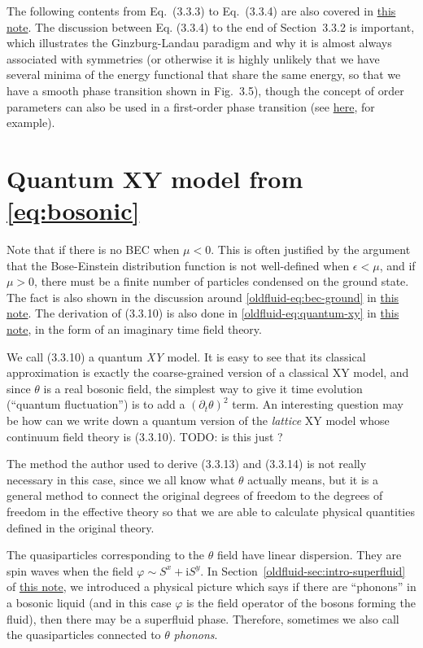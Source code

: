 \documentclass[hyperref, a4paper]{article}
\newcommand*{\ii}{\mathrm{i}}
\newcommand{\oldfluid}{\href{fluid.pdf}{this note}}
\begin{document}
The following contents from Eq.~(3.3.3) to Eq.~(3.3.4) are also covered in \oldfluid. 
The discussion between Eq. (3.3.4) to the end of Section~3.3.2 is important, which illustrates the 
Ginzburg-Landau paradigm and why it is almost always associated with symmetries (or otherwise it is 
highly unlikely that we have several minima of the energy functional that share the same energy, so 
that we have a smooth phase transition shown in Fig.~3.5), though the concept of order parameters 
can also be used in a first-order phase transition (see \href{../quasicrystal-fd/main.pdf}{here}, 
for example).  

\section{Quantum XY model from \eqref{eq:bosonic}}\label{sec:quantum-xy}

Note that if there is no BEC when $\mu < 0$.  
This is often justified by the argument that the 
Bose-Einstein distribution function is not well-defined when $\epsilon < \mu$, and if $\mu > 0$,
there must be a finite number of particles condensed on the ground state. The fact is also shown 
in the discussion around \eqref{oldfluid-eq:bec-ground} in \oldfluid.
The derivation of (3.3.10) is also done in \eqref{oldfluid-eq:quantum-xy} in \oldfluid, in the form 
of an imaginary time field theory. 

We call (3.3.10) a quantum \emph{XY} model. It is easy to see that its classical approximation is 
exactly the coarse-grained version of a classical XY model, and since $\theta$ is a real bosonic field,
the simplest way to give it time evolution (``quantum fluctuation'') is to add a $(\partial_t \theta)^2$
term. An interesting question may be how can we write down a quantum version of the \emph{lattice} XY 
model whose continuum field theory is (3.3.10). TODO: is this just \cite{latticemodel,Z_iga_2014}?

The method the author used to derive (3.3.13) and (3.3.14) is not really necessary in this case, 
since we all know what $\theta$ actually means, but it is a general method to connect the original 
degrees of freedom to the degrees of freedom in the effective theory so that we are able to calculate 
physical quantities defined in the original theory.

The quasiparticles corresponding to the $\theta$ field have linear dispersion. They are spin waves when 
the field $\varphi \sim S^x + \ii S^y$. In Section~\ref{oldfluid-sec:intro-superfluid} of \oldfluid,
we introduced a physical picture which says if there are ``phonons'' in a bosonic liquid (and in this case 
$\varphi$ is the field operator of the bosons forming the fluid), then there may be a superfluid phase.
Therefore, sometimes we also call the quasiparticles connected to $\theta$ \emph{phonons}.
\end{document}
